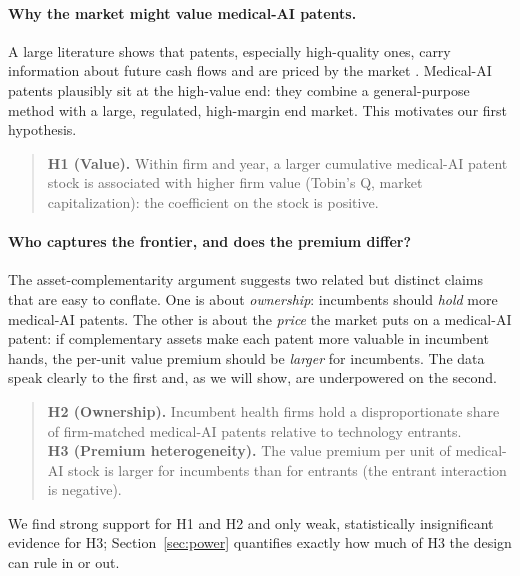 \documentclass[12pt]{article}
\begin{document}
\paragraph{Why the market might value medical-AI patents.} A large literature shows that patents,
especially high-quality ones, carry information about future cash flows and are priced by the
market \citep{hall2005,kpss2017,hirshleifer2013}. Medical-AI patents plausibly sit at the
high-value end: they combine a general-purpose method with a large, regulated, high-margin end
market. This motivates our first hypothesis.
\begin{quote}
\textbf{H1 (Value).} Within firm and year, a larger cumulative medical-AI patent stock is
associated with higher firm value (Tobin's Q, market capitalization): the coefficient on the
stock is positive.
\end{quote}

\paragraph{Who captures the frontier, and does the premium differ?} The asset-complementarity
argument suggests two related but distinct claims that are easy to conflate. One is about
\emph{ownership}: incumbents should \emph{hold} more medical-AI patents. The other is about the
\emph{price} the market puts on a medical-AI patent: if complementary assets make each patent more
valuable in incumbent hands, the per-unit value premium should be \emph{larger} for incumbents.
The data speak clearly to the first and, as we will show, are underpowered on the second.
\begin{quote}
\textbf{H2 (Ownership).} Incumbent health firms hold a disproportionate share of firm-matched
medical-AI patents relative to technology entrants.\\[2pt]
\textbf{H3 (Premium heterogeneity).} The value premium per unit of medical-AI stock is larger for
incumbents than for entrants (the entrant interaction is negative).
\end{quote}
We find strong support for H1 and H2 and only weak, statistically insignificant evidence for H3;
Section~\ref{sec:power} quantifies exactly how much of H3 the design can rule in or out.
\end{document}
